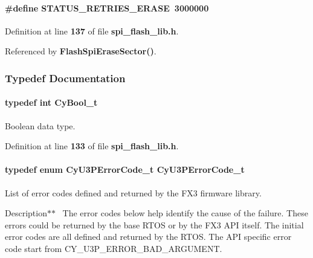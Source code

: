 \paragraph[{S\+T\+A\+T\+U\+S\+\_\+\+R\+E\+T\+R\+I\+E\+S\+\_\+\+E\+R\+A\+SE}]{\setlength{\rightskip}{0pt plus 5cm}\#define S\+T\+A\+T\+U\+S\+\_\+\+R\+E\+T\+R\+I\+E\+S\+\_\+\+E\+R\+A\+SE~3000000}\label{spi__flash__lib_8h_a3b4a59e267ec4b3eb4fb4f9182676b5c}


Definition at line {\bf 137} of file {\bf spi\+\_\+flash\+\_\+lib.\+h}.



Referenced by {\bf Flash\+Spi\+Erase\+Sector()}.



\subsubsection{Typedef Documentation}
\paragraph[{Cy\+Bool\+\_\+t}]{\setlength{\rightskip}{0pt plus 5cm}typedef int {\bf Cy\+Bool\+\_\+t}}\label{spi__flash__lib_8h_adb8469c2d8c8deefaa461320adfa902c}


Boolean data type. 



Definition at line {\bf 133} of file {\bf spi\+\_\+flash\+\_\+lib.\+h}.

\paragraph[{Cy\+U3\+P\+Error\+Code\+\_\+t}]{\setlength{\rightskip}{0pt plus 5cm}typedef enum {\bf Cy\+U3\+P\+Error\+Code\+\_\+t}  {\bf Cy\+U3\+P\+Error\+Code\+\_\+t}}\label{spi__flash__lib_8h_ab05f4ca55fcc053034ad1f6584c0ebdb}


List of error codes defined and returned by the F\+X3 firmware library. 

Description$\ast$$\ast$~\newline
The error codes below help identify the cause of the failure. These errors could be returned by the base R\+T\+OS or by the F\+X3 A\+PI itself. The initial error codes are all defined and returned by the R\+T\+OS. The A\+PI specific error code start from C\+Y\+\_\+\+U3\+P\+\_\+\+E\+R\+R\+O\+R\+\_\+\+B\+A\+D\+\_\+\+A\+R\+G\+U\+M\+E\+NT. 
